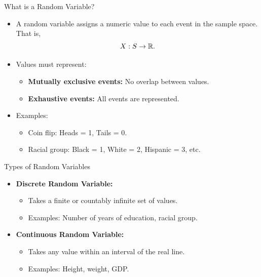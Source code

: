 \documentclass[aspectratio=169]{beamer}
\begin{document}
\begin{frame}{What is a Random Variable?}
    \begin{itemize}
        \item A random variable assigns a numeric value to each event in the sample space. That is,
        $$
        X:S\rightarrow \mathbb{R}.
        $$
        \item Values must represent:
        \begin{itemize}
            \item[$\bullet$] \textbf{Mutually exclusive events:} No overlap between values.
            \item[$\bullet$] \textbf{Exhaustive events:} All events are represented.
        \end{itemize}
        \item Examples:
        \begin{itemize}
            \item[$\bullet$] Coin flip: Heads = 1, Tails = 0.
            \item[$\bullet$] Racial group: Black = 1, White = 2, Hispanic = 3, etc.
        \end{itemize}
    \end{itemize}
\end{frame}

\begin{frame}{Types of Random Variables}
    \begin{itemize}
        \item \textbf{Discrete Random Variable:}
        \begin{itemize}
            \item[$\bullet$] Takes a finite or countably infinite set of values.
            \item[$\bullet$] Examples: Number of years of education, racial group.
        \end{itemize}
        \item \textbf{Continuous Random Variable:}
        \begin{itemize}
            \item[$\bullet$] Takes any value within an interval of the real line.
            \item[$\bullet$] Examples: Height, weight, GDP.
        \end{itemize}
    \end{itemize}
\end{frame}
\end{document}
